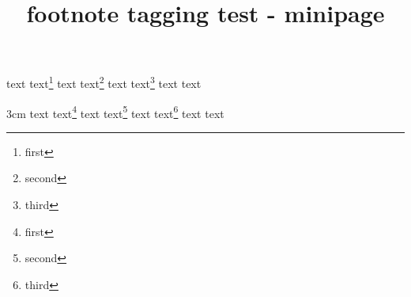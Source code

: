 \documentclass{article}
\title{footnote tagging test - minipage}
\begin{document}
\begin{savenotes}
\begin{minipage}{3cm}
text text\footnote{first} text text\footnote{second} text text\footnote{third} text text
\end{minipage}
\end{savenotes}

\begin{minipage*}{3cm}
text text\footnote{first} text text\footnote{second} text text\footnote{third} text text
\end{minipage*}
\end{document}
